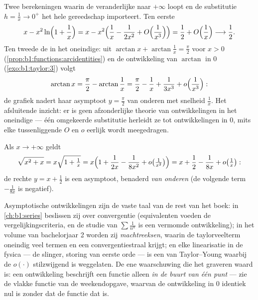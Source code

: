 \begin{example}\label{ex:b1:taylor:atinfinity}
Twee berekeningen waarin de veranderlijke naar $+\infty$ loopt en
de substitutie $h = \frac1x \to 0^+$ het hele gereedschap
importeert. Ten eerste
\[
x - x^2\ln\Bigl(1 + \frac1x\Bigr)
= x - x^2\Bigl(\frac1x - \frac{1}{2x^2} +
O\Bigl(\frac{1}{x^3}\Bigr)\Bigr)
= \frac12 + O\Bigl(\frac1x\Bigr) \longrightarrow \frac12 .
\]
Ten tweede de  in het oneindige: uit $\arctan x +
\arctan\frac1x = \frac\pi2$ voor $x > 0$
(\cref{prop:b1:functions:arcidentities}) en de ontwikkeling van
$\arctan$ in $0$ (\cref{exo:b1:taylor:3}) volgt
\[
\arctan x = \frac\pi2 - \arctan\frac1x
= \frac\pi2 - \frac1x + \frac{1}{3x^3} +
o\Bigl(\frac{1}{x^3}\Bigr) :
\]
de grafiek nadert haar asymptoot $y = \frac\pi2$ van onderen met
snelheid $\frac1x$. Het afsluitende inzicht: er is geen
afzonderlijke theorie van ontwikkelingen in het oneindige --- één
omgekeerde substitutie herleidt ze tot ontwikkelingen in $0$, mits
elke tussenliggende $O$ en $o$ eerlijk wordt meegedragen.
\end{example}

\begin{example}\label{ex:b1:taylor:asymptote}
Als $x \to +\infty$ geldt
\[
\sqrt{x^2 + x} = x\sqrt{1 + \tfrac1x}
= x\Bigl(1 + \frac{1}{2x} - \frac{1}{8x^2} + o\bigl(\tfrac{1}{x^2}\bigr)\Bigr)
= x + \frac12 - \frac{1}{8x} + o\bigl(\tfrac 1x\bigr):
\]
de rechte $y = x + \frac12$ is een asymptoot, benaderd
\emph{van onderen} (de volgende term $-\frac{1}{8x}$ is negatief).
\end{example}

\begin{remark}
Asymptotische ontwikkelingen zijn de vaste taal van de rest van
het boek: in \cref{ch:b1:series} beslissen zij over convergentie
(equivalenten voeden de vergelijkingscriteria, en de studie van
$\sum \frac{1}{n^\alpha}$ is een vermomde ontwikkeling); in het
volume van bachelorjaar 2 worden zij \emph{machtreeksen}, waarin
de taylorveelterm oneindig veel termen en een
convergentiestraal krijgt; en elke linearisatie in de fysica ---
de slinger, storing van eerste orde --- is een  van
Taylor--Young waarbij de $o(\cdot)$ stilzwijgend is weggelaten.
De ene waarschuwing die het graveren waard is: een ontwikkeling
beschrijft een functie alleen \emph{in de buurt van één punt} ---
zie de vlakke functie van de weekendopgave, waarvan de
ontwikkeling in $0$ identiek nul is zonder dat de functie dat is.
\end{remark}

